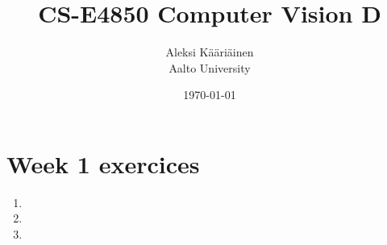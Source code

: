 \documentclass[11pt,a4paper]{article}
\title{CS-E4850 Computer Vision D}
\author{Aleksi Kääriäinen  \\
	Aalto University  \\
	}
\begin{document}
\date{\today}

\maketitle

\newpage

\section*{Week 1 exercices}

\begin{enumerate}
      \item

            \newpage

      \item

            \newpage

      \item

            \newpage

\end{enumerate}
\end{document}
